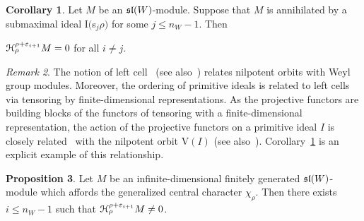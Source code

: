 \documentclass[12pt]{amsart}
\theoremstyle{definition}\newtheorem{theorem}{Theorem}[section]
\newtheorem{proposition}{Proposition}[section]
\newtheorem{corollary}[proposition]{Corollary}
\theoremstyle{definition}\newtheorem{definition}[proposition]{Definition}
\theoremstyle{remark}\newtheorem{example}[proposition]{Example}
\newtheorem{remark}[proposition]{Remark}
\begin{document}
\begin{corollary}\label{Casn}Let $M$ be an $\frak{sl}(W)$-module. Suppose that $M$ is annihilated by a submaximal ideal I$($s$_j\rho)$ for
some $j\le n_W-1$. Then \begin{center}$\EuScript H_\rho^{\rho+\varepsilon_{i+1}}M=0$ for all $i\ne j$.\end{center}\end{corollary}
\begin{remark}The notion of left cell~\cite{Jo4} (see also~\cite{Vo2}) relates nilpotent orbits with Weyl group modules. Moreover, the ordering of primitive ideals is related to left cells via tensoring by finite-dimensional representations. As the projective functors are building blocks of the functors of tensoring with a finite-dimensional representation, the action of the projective functors on a primitive ideal $I$ is closely related~\cite{Jo5} with the nilpotent orbit V$(I)$ (see also~\cite{Jo6}). Corollary~\ref{Casn} is an explicit example of this relationship.\end{remark}
\begin{proposition} Let $M$ be an infinite-dimensional finitely generated $\frak{sl}(W)$-module which affords the generalized central character $\chi_\rho$. Then there exists $i\le n_W-1$ such that $\EuScript H_\rho^{\rho+\varepsilon_{i+1}}M\ne 0$.\end{proposition}
\end{document}
